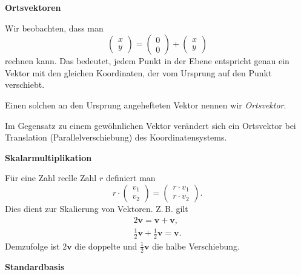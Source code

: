 \documentclass[9pt]{beamer}
\newcommand{\bv}[1]{\mathbf{#1}}
\newcommand{\strong}[1]{\textsf{\textbf{#1}}}
\newcommand{\parspace}{\vspace{0.8em}}
\begin{document}
\begin{frame}
\begin{center}
\strong{Ortsvektoren}
\end{center}
\end{frame}

\begin{frame}
Wir beobachten, dass man
\[\begin{pmatrix}x\\ y\end{pmatrix}
= \begin{pmatrix}0\\ 0\end{pmatrix} + \begin{pmatrix}x\\ y\end{pmatrix}\]
rechnen kann. Das bedeutet, jedem Punkt in der Ebene entspricht genau
ein Vektor mit den gleichen Koordinaten, der vom Ursprung auf den Punkt
verschiebt.\pause

\parspace
Einen solchen an den Ursprung angehefteten Vektor nennen wir \emph{Ortsvektor}.\pause

\parspace
Im Gegensatz zu einem gewöhnlichen Vektor verändert sich ein Ortsvektor
bei Translation (Parallelverschiebung) des Koordinatensystems.
\end{frame}

\begin{frame}
\begin{center}
\strong{Skalarmultiplikation}
\end{center}
\end{frame}

\begin{frame}
Für eine Zahl reelle Zahl $r$ definiert man
\[r\cdot\begin{pmatrix}v_1\\ v_2\end{pmatrix}
= \begin{pmatrix}r\cdot v_1\\ r\cdot v_2\end{pmatrix}.\]\pause
Dies dient zur Skalierung von Vektoren. Z.\,B. gilt
\begin{gather*}
2\bv v = \bv v + \bv v,\\
\tfrac{1}{2}\bv v + \tfrac{1}{2}\bv v = \bv v.
\end{gather*}
Demzufolge ist $2\bv v$ die doppelte und $\tfrac{1}{2}\bv v$ die halbe
Verschiebung.
\end{frame}

\begin{frame}
\begin{center}
\strong{Standardbasis}
\end{center}
\end{frame}
\end{document}
